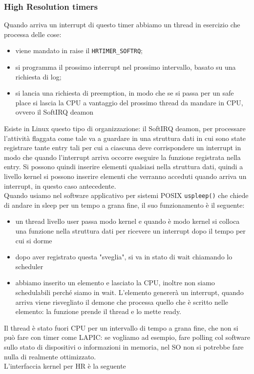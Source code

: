 \documentclass[12pt, oneside]{extbook}
\begin{document}
\subsubsection{High Resolution timers}
Quando arriva un interrupt di questo timer abbiamo un thread in esercizio che processa delle cose:
\begin{itemize}
\item viene mandato in raise il \texttt{HRTIMER\_SOFTRQ};
\item si programma il prossimo interrupt nel prossimo intervallo, basato su una richiesta di log;
\item si lancia una richiesta di preemption, in modo che se si passa per un safe place si lascia la CPU a vantaggio del prossimo thread da mandare in CPU, ovvero il SoftIRQ deamon
\end{itemize}
Esiste in Linux questo tipo di organizzazione: il SoftIRQ deamon, per processare l'attività flaggata come tale va a guardare in una struttura dati in cui sono state registrare tante entry tali per cui a ciascuna deve corrispondere un interrupt in modo che quando l'interrupt arriva occorre eseguire la funzione registrata nella entry. Si possono quindi inserire elementi qualsiasi nella struttura dati, quindi a livello kernel si possono inserire elementi che verranno acceduti quando arriva un interrupt, in questo caso antecedente.\\Quando usiamo nel software applicativo per sistemi POSIX \texttt{uspleep()} che chiede di andare in sleep per un tempo a grana fine, il suo funzionamento è il seguente:
\begin{itemize}
\item un thread livello user passa modo kernel e quando è modo kernel si colloca una funzione nella struttura dati per ricevere un interrupt dopo il tempo per cui si dorme
\item dopo aver registrato questa "sveglia", si va in stato di wait chiamando lo scheduler
\item abbiamo inserito un elemento e lasciato la CPU, inoltre non siamo schedulabili perché siamo in wait. L'elemento genererà un interrupt, quando arriva viene risvegliato il demone che processa quello che è scritto nelle elemento: la funzione prende il thread e lo mette ready.
\end{itemize}
Il thread è stato fuori CPU per un intervallo di tempo a grana fine, che non si può fare con timer come LAPIC: se vogliamo ad esempio, fare polling col software sullo stato di dispositivi o informazioni in memoria, nel SO non si potrebbe fare nulla di realmente ottimizzato.\\L'interfaccia kernel per HR è la seguente
\end{document}
